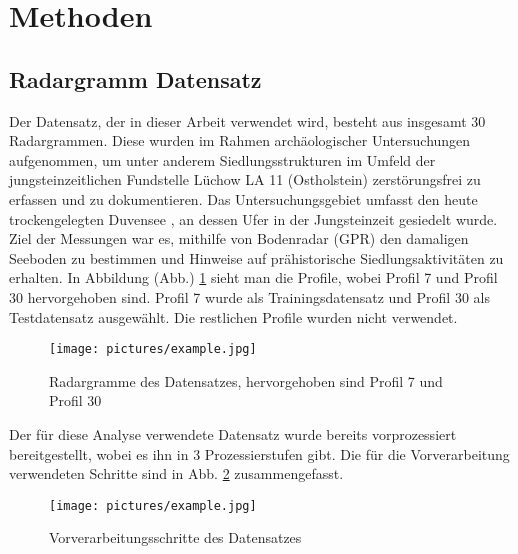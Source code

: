 \section{Methoden}

\subsection{Radargramm Datensatz}

Der Datensatz, der in dieser Arbeit verwendet wird, besteht aus insgesamt 30 Radargrammen. Diese wurden im Rahmen archäologischer Untersuchungen aufgenommen, um unter anderem Siedlungsstrukturen im Umfeld der jungsteinzeitlichen Fundstelle Lüchow LA 11 (Ostholstein) zerstörungsfrei zu erfassen und zu dokumentieren. Das Untersuchungsgebiet umfasst den heute trockengelegten Duvensee \parencites{corradini_day_2023}{corradini_understanding_2020}, an dessen Ufer in der Jungsteinzeit gesiedelt wurde. Ziel der Messungen war es, mithilfe von Bodenradar (GPR) den damaligen Seeboden zu bestimmen und Hinweise auf prähistorische Siedlungsaktivitäten zu erhalten.  In Abbildung (Abb.) \ref{fig:map} sieht man die Profile, wobei Profil 7 und Profil 30 hervorgehoben sind. Profil 7 wurde als Trainingsdatensatz und Profil 30 als Testdatensatz ausgewählt. Die restlichen Profile wurden nicht verwendet.\\


\begin{figure}[H]
    \centering
    \texttt{[image: pictures/example.jpg]}
    \caption{Radargramme des Datensatzes, hervorgehoben sind Profil 7 und Profil 30}
    \label{fig:map}
\end{figure}
Der für diese Analyse verwendete Datensatz wurde bereits vorprozessiert bereitgestellt, wobei es ihn in 3 Prozessierstufen gibt. Die für die Vorverarbeitung verwendeten Schritte sind in Abb. \ref{fig:preprocessing_steps} zusammengefasst. \\

\begin{figure}[H]
    \centering
    \texttt{[image: pictures/example.jpg]}
    \caption{Vorverarbeitungsschritte des Datensatzes}
    \label{fig:preprocessing_steps}
\end{figure}

